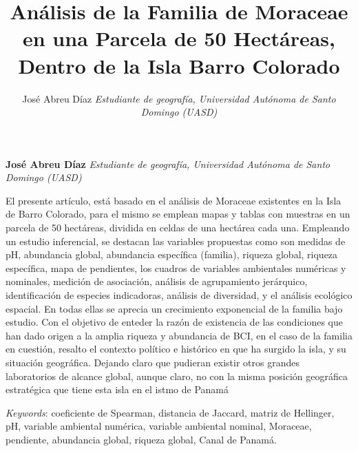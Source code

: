 \documentclass[11pt,]{article}
\title{Análisis de la Familia de Moraceae en una Parcela de 50 Hectáreas,
Dentro de la Isla Barro Colorado  }
\author{\Large José Abreu Díaz\vspace{0.05in} \newline\normalsize\emph{Estudiante de geografía, Universidad Autónoma de Santo Domingo (UASD)}  }
\date{}
\newcommand*{\authorfont}{\fontfamily{phv}\selectfont}
\renewenvironment{abstract}
 {{%
    \setlength{\leftmargin}{0mm}
    \setlength{\rightmargin}{\leftmargin}%
  }%
  \relax}
 {\endlist}
\begin{document}
	
%

{%
\setlength{\parindent}{0pt}
\thispagestyle{plain}
{\fontsize{18}{20}\selectfont\raggedright 
\maketitle  %

}

{
   \vskip 13.5pt\relax \normalsize\fontsize{11}{12} 
\textbf{\authorfont José Abreu Díaz} \hskip 15pt \emph{\small Estudiante de geografía, Universidad Autónoma de Santo Domingo (UASD)}   

}

}








\begin{abstract}

    \hbox{\vrule height .2pt width 39.14pc}

    \vskip 8.5pt %

\noindent El presente artículo, está basado en el análisis de Moraceae existentes
en la Isla de Barro Colorado, para el mismo se emplean mapas y tablas
con muestras en un parcela de 50 hectáreas, dividida en celdas de una
hectárea cada una. Empleando un estudio inferencial, se destacan las
variables propuestas como son medidas de pH, abundancia global,
abundancia específica (familia), riqueza global, riqueza específica,
mapa de pendientes, los cuadros de variables ambientales numéricas y
nominales, medición de asociación, análisis de agrupamiento jerárquico,
identificación de especies indicadoras, análisis de diversidad, y el
análisis ecológico espacial. En todas ellas se aprecia un crecimiento
exponencial de la familia bajo estudio. Con el objetivo de enteder la
razón de existencia de las condiciones que han dado origen a la amplia
riqueza y abundancia de BCI, en el caso de la familia en cuestión,
resalto el contexto político e histórico en que ha surgido la isla, y su
situación geográfica. Dejando claro que pudieran existir otros grandes
laboratorios de alcance global, aunque claro, no con la misma posición
geográfica estratégica que tiene esta isla en el istmo de Panamá


\vskip 8.5pt \noindent \emph{Keywords}: coeficiente de Spearman, distancia de Jaccard, matriz de Hellinger, pH,
variable ambiental numérica, variable ambiental nominal, Moraceae,
pendiente, abundancia global, riqueza global, Canal de Panamá. \par

    \hbox{\vrule height .2pt width 39.14pc}



\end{abstract}
\end{document}
